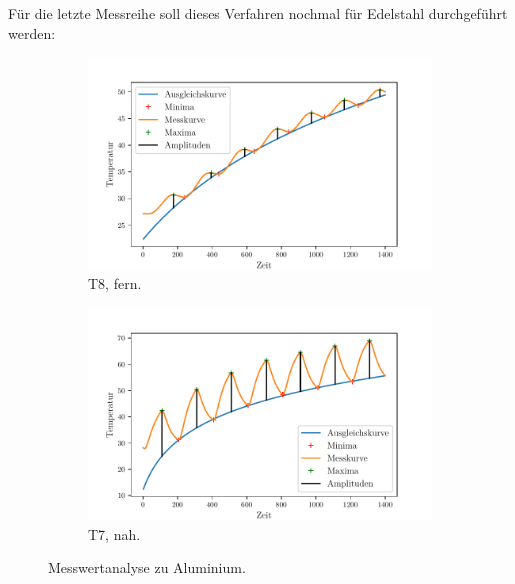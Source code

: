 Für die letzte Messreihe soll dieses Verfahren nochmal für Edelstahl durchgeführt werden:
\begin{figure}
    \centering
    \begin{subfigure}{.5\textwidth}
        \centering
        \includegraphics[max width=1.1\linewidth]{plots/amplitudes_steel_far(t8).pdf}
        \caption{T8, fern.}
        \label{fig:plot_amps_t8}
    \end{subfigure}%
    \begin{subfigure}{.5\textwidth}
        \centering
        \includegraphics[max width=1.1\linewidth]{plots/amplitudes_steel_close(t7).pdf}
        \caption{T7, nah.}
        \label{fig:plot_amps_t7}
    \end{subfigure}
    \caption{Messwertanalyse zu Aluminium.}
    \label{fig:plots_amps_t7_t8}
\end{figure}
